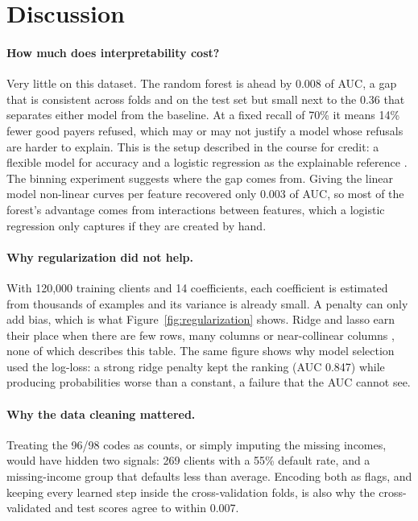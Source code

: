 \section{Discussion}
\label{sec:discussion}
\paragraph{How much does interpretability cost?} Very little on this dataset.
The random forest is ahead by 0.008 of AUC, a gap that is consistent across
folds and on the test set but small next to the 0.36 that separates either
model from the baseline. At a fixed recall of 70\% it means 14\% fewer good
payers refused, which may or may not justify a model whose refusals are harder
to explain. This is the setup described in the course for credit: a flexible
model for accuracy and a logistic regression as the explainable reference
\citep{oku2026slides}. The binning experiment suggests where the gap comes
from. Giving the linear model non-linear curves per feature recovered only
0.003 of AUC, so most of the forest's advantage comes from interactions between
features, which a logistic regression only captures if they are created by
hand.

\paragraph{Why regularization did not help.} With 120{,}000 training clients
and 14 coefficients, each coefficient is estimated from thousands of examples
and its variance is already small. A penalty can only add bias, which is what
Figure~\ref{fig:regularization} shows. Ridge and lasso earn their place when
there are few rows, many columns or near-collinear columns
\citep{oku2026slides,james2021islr}, none of which describes this table. The
same figure shows why model selection used the log-loss: a strong ridge
penalty kept the ranking (AUC 0.847) while producing probabilities worse
than a constant, a failure that the AUC cannot see.

\paragraph{Why the data cleaning mattered.} Treating the 96/98 codes as counts,
or simply imputing the missing incomes, would have hidden two signals: 269
clients with a 55\% default rate, and a missing-income group that defaults
less than average. Encoding both as flags, and keeping every learned step
inside the cross-validation folds, is also why the cross-validated and test
scores agree to within 0.007.


